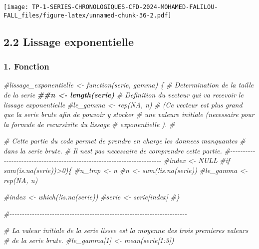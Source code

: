 \documentclass[
]{article}
\newenvironment{Shaded}{\begin{snugshade}}{\end{snugshade}}
\newcommand{\CommentTok}[1]{\textcolor[rgb]{0.56,0.35,0.01}{\textit{#1}}}
\newcommand{\DocumentationTok}[1]{\textcolor[rgb]{0.56,0.35,0.01}{\textbf{\textit{#1}}}}
\begin{document}
\texttt{[image: TP-1-SERIES-CHRONOLOGIQUES-CFD-2024-MOHAMED-FALILOU-FALL\_files/figure-latex/unnamed-chunk-36-2.pdf]}

\subsection{2.2 Lissage exponentielle}\label{lissage-exponentielle}

\subsubsection{1. Fonction}\label{fonction}

\begin{Shaded}
\begin{Highlighting}[]
\CommentTok{\#lissage\_exponentielle \textless{}{-} function(serie, gamma) \{ }
\CommentTok{\# Determination de la taille de la serie }
  \DocumentationTok{\#\#n \textless{}{-} length(serie)}
\CommentTok{\# Definition du vecteur qui va recevoir le lissage exponentielle }
  \CommentTok{\#le\_gamma \textless{}{-} rep(NA, n)}
\CommentTok{\# (Ce vecteur est plus grand que la serie brute afin de pouvoir y stocker }
\CommentTok{\# une valeure initiale (necessaire pour la formule de recursivite du lissage }
\CommentTok{\# exponentielle ).}
  \CommentTok{\# }
  
\CommentTok{\# Cette partie du code permet de prendre en charge les donnees manquantes }
\CommentTok{\# dans la serie brute.}
\CommentTok{\# Il n\textquotesingle{}est pas necessaire de comprendre cette partie. }
\CommentTok{\#{-}{-}{-}{-}{-}{-}{-}{-}{-}{-}{-}{-}{-}{-}{-}{-}{-}{-}{-}{-}{-}{-}{-}{-}{-}{-}{-}{-}{-}{-}{-}{-}{-}{-}{-}{-}{-}{-}{-}{-}{-}{-}{-}{-}{-}{-}{-}{-}{-}{-}{-}{-}{-}{-}{-}{-}{-}{-}{-}{-}{-}{-}{-}{-}{-}{-}{-}{-}{-}{-}{-}{-}{-}}
  \CommentTok{\#index \textless{}{-} NULL}
  \CommentTok{\#if sum(is.na(serie))\textgreater{}0)\{}
    \CommentTok{\#n\_tmp \textless{}{-} n}
    \CommentTok{\#n \textless{}{-} sum(!is.na(serie))}
    \CommentTok{\#le\_gamma \textless{}{-} rep(NA, n)}
    
    
    \CommentTok{\#index \textless{}{-} which(!is.na(serie))}
    \CommentTok{\#serie \textless{}{-} serie[index]}
  \CommentTok{\#\}}

\CommentTok{\#{-}{-}{-}{-}{-}{-}{-}{-}{-}{-}{-}{-}{-}{-}{-}{-}{-}{-}{-}{-}{-}{-}{-}{-}{-}{-}{-}{-}{-}{-}{-}{-}{-}{-}{-}{-}{-}{-}{-}{-}{-}{-}{-}{-}{-}{-}{-}{-}{-}{-}{-}{-}{-}{-}{-}{-}{-}{-}{-}{-}{-}{-}{-}{-}{-}{-}{-}{-}{-}{-}{-}}

\CommentTok{\# La valeur initiale de la serie lissee est la moyenne des trois premieres valeurs }
\CommentTok{\# de la serie brute.}
\CommentTok{\#le\_gamma[1] \textless{}{-} mean(serie[1:3])}



\end{Highlighting}
\end{Shaded}
\end{document}
